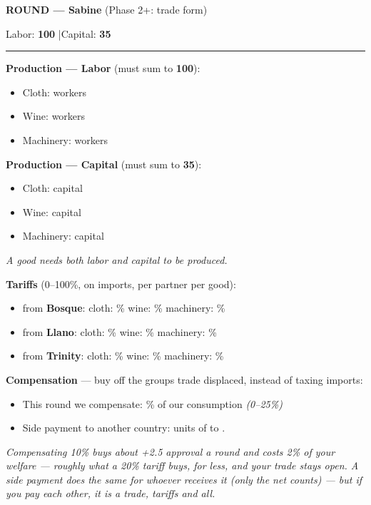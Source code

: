 \documentclass[11pt]{article}
\newcommand{\blank}[1]{\underline{\hspace{#1}}}
\newcommand{\hr}{\par\vspace{2pt}\noindent\rule{\linewidth}{0.4pt}\par\vspace{2pt}}
\begin{document}
{\large\bfseries ROUND \blank{1cm} --- Sabine} \hfill (Phase 2+: trade form)\par
Labor: \textbf{100} \quad|\quad Capital: \textbf{35}
\hr

{\bfseries Production --- Labor} (must sum to \textbf{100}):\par
\begin{itemize}[nosep,leftmargin=1.4em]
  \item Cloth: \blank{2.5cm} workers
  \item Wine: \blank{2.5cm} workers
  \item Machinery: \blank{2.5cm} workers
\end{itemize}

{\bfseries Production --- Capital} (must sum to \textbf{35}):\par
\begin{itemize}[nosep,leftmargin=1.4em]
  \item Cloth: \blank{2.5cm} capital
  \item Wine: \blank{2.5cm} capital
  \item Machinery: \blank{2.5cm} capital
\end{itemize}
\textit{A good needs \emph{both} labor and capital to be produced.}

\vspace{4pt}
{\bfseries Tariffs} (0--100\%, on imports, per partner per good):\par
\begin{itemize}[nosep,leftmargin=1.4em]
  \item from \textbf{Bosque}: \quad cloth: \blank{1.4cm}\% \quad wine: \blank{1.4cm}\% \quad machinery: \blank{1.4cm}\%
  \item from \textbf{Llano}: \quad cloth: \blank{1.4cm}\% \quad wine: \blank{1.4cm}\% \quad machinery: \blank{1.4cm}\%
  \item from \textbf{Trinity}: \quad cloth: \blank{1.4cm}\% \quad wine: \blank{1.4cm}\% \quad machinery: \blank{1.4cm}\%
\end{itemize}

\vspace{4pt}
{\bfseries Compensation} --- buy off the groups trade displaced, instead of taxing imports:\par
\begin{itemize}[nosep,leftmargin=1.4em]
  \item This round we compensate: \blank{1.4cm}\% of our consumption \quad \textit{(0--25\%)}
  \item Side payment to another country: \blank{1.6cm} units of \blank{2cm} to \blank{2.2cm}.
\end{itemize}
\textit{Compensating 10\% buys about +2.5 approval a round and costs 2\% of your welfare --- roughly what a 20\% tariff buys, for less, and your trade stays open. A side payment does the same for whoever receives it (only the net counts) --- but if you pay each other, it is a trade, tariffs and all.}
\end{document}
